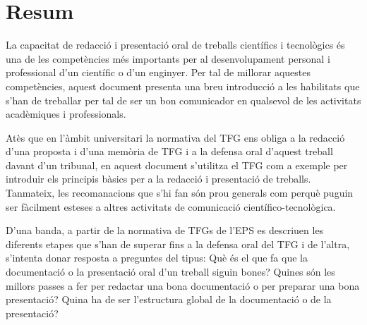 
\chapter{Resum}

La capacitat de redacció i presentació oral de treballs científics i tecnològics és una de les competències més importants per al desenvolupament personal i professional d'un científic o d'un enginyer. Per tal de millorar aquestes competències, aquest document presenta una breu introducció a les habilitats que s'han de treballar per tal de ser un bon comunicador en qualsevol de les activitats acadèmiques i professionals.

Atès que en l'àmbit universitari la normativa del \ac{TFG} ens obliga a la redacció d'una proposta i d'una memòria de \ac{TFG} i a la defensa oral d'aquest treball davant d'un tribunal, en aquest document s'utilitza el \ac{TFG} com a exemple per introduir els principis bàsics per a la redacció i presentació de treballs. Tanmateix, les recomanacions que s'hi fan són prou generals com perquè puguin ser fàcilment esteses a altres activitats de comunicació científico-tecnològica.

D'una banda, a partir de la normativa de \acsp{TFG} de l'\ac{EPS} es descriuen les diferents etapes que s'han de superar fins a la defensa oral del \ac{TFG} i de l'altra, s'intenta donar resposta a preguntes del tipus: Què és el que fa que la documentació o la presentació oral d'un treball siguin bones? Quines són les millors passes a fer per redactar una bona documentació o per preparar una bona presentació? Quina ha de ser l'estructura global de la documentació o de la presentació? 